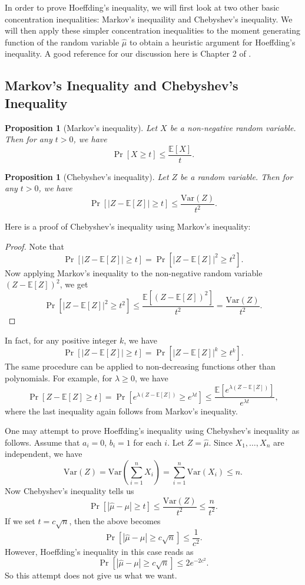 \documentclass[11pt]{article}
\newtheorem{proposition}[theorem]{Proposition}
\newcommand{\E}{\mathbb{E}}
\newcommand{\Var}{\text{Var}}
\begin{document}
In order to prove Hoeffding's inequality, we will first look at two other basic concentration inequalities: Markov's inequaility and Chebyshev's inequality. We will then apply these simpler concentration inequalities to the moment generating function of the random variable $\hat \mu$ to obtain a heuristic argument for Hoeffding's inequality. A good reference for our discussion here is Chapter 2 of \cite{W}.


\subsection{Markov's Inequality and Chebyshev's Inequality}

\begin{proposition}[Markov's inequality]
Let $X$ be a non-negative random variable. Then for any $t>0$, we have
$$  \Pr[X \ge t] \le \frac{\E[X]}{t}.   $$
\end{proposition}

\begin{proposition}[Chebyshev's inequality]
Let $Z$ be a random variable. Then for any $t>0$, we have
$$  \Pr[|Z - \E[Z]| \ge t] \le \frac{\Var(Z)}{t^2}. $$
\end{proposition}

Here is a proof of Chebyshev's inequality using Markov's inequality:
\begin{proof}
Note that
$$  \Pr[|Z-\E[Z]| \ge t] = \Pr[|Z-\E[Z]|^2 \ge t^2].    $$
Now applying Markov's inequality to the non-negative random variable $(Z-\E[Z])^2$, we get
$$  \Pr[|Z-\E[Z]|^2 \ge t^2] \le \frac{\E[(Z-\E[Z])^2]}{t^2} = \frac{\Var(Z)}{t^2}.    $$
\end{proof}
In fact, for any positive integer $k$, we have
$$  \Pr[|Z-\E[Z]| \ge t] = \Pr[|Z-\E[Z]|^k \ge t^k].    $$
The same procedure can be applied to non-decreasing functions other than polynomials. For example, for $\lambda \ge 0$, we have
\begin{equation}\label{ExpLambda}
    \Pr[Z-\E[Z] \ge t] = \Pr[e^{\lambda(Z-\E[Z])} \ge e^{\lambda t}] \le \frac{\E[e^{\lambda(Z-\E[Z])}]}{e^{\lambda t}},
\end{equation}
where the last inequality again follows from Markov's inequality.

One may attempt to prove Hoeffding's inequality using Chebyshev's inequality as follows. Assume that $a_i = 0$, $b_i =1$ for each $i$. Let $Z = \hat \mu$. Since $X_1, \ldots, X_n$ are independent, we have 
$$  \Var(Z) = \Var \left(\sum_{i = 1}^n X_i \right) = \sum_{i=1}^n \Var(X_i) \le n.$$
Now Chebyshev's inequality tells us
$$  \Pr[|\hat \mu - \mu| \ge t] \le \frac{\Var(Z)}{t^2} \le \frac{n}{t^2}.  $$
If we set $t = c\sqrt{n}$, then the above becomes
$$  \Pr[|\hat \mu-\mu| \ge c\sqrt{n}] \le \frac{1}{c^2}.    $$
However, Hoeffding's inequality in this case reads as
$$  \Pr[|\hat \mu-\mu| \ge c\sqrt{n}] \le 2e^{-2c^2}.    $$
So this attempt does not give us what we want.
\end{document}
